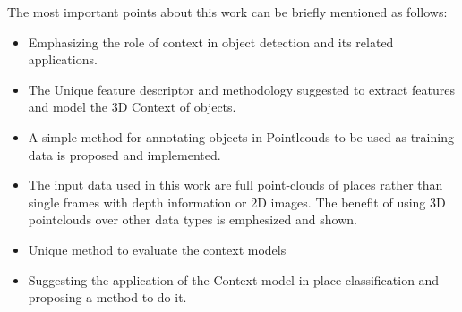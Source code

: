  The most important points about this work can be briefly mentioned as follows:
 
 \begin{itemize}
  \item Emphasizing the role of context in object detection and its related applications.
  \item The Unique feature descriptor and methodology suggested to extract features and model the 3D Context of objects.
  \item A simple method for annotating objects in Pointlcouds to be used as training data is proposed and implemented.
  \item The input data used in this work are full point-clouds of places rather than single frames with depth information or 
  2D images. The benefit of using 3D pointclouds over other data types is emphesized and shown.
  \item Unique method to evaluate the context models
  \item Suggesting the application of the Context model in place classification and proposing a method to do it.
  
 \end{itemize}

 
% 

